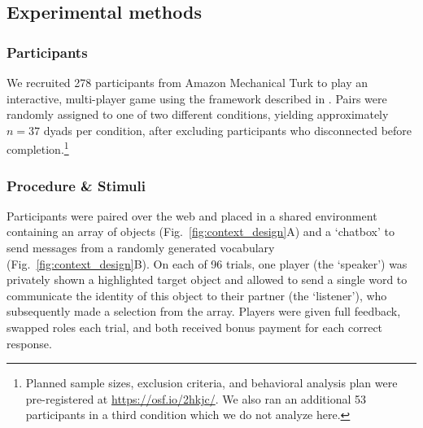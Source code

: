 			
\subsection{Experimental methods}

\subsubsection{Participants}

We recruited 278 participants from Amazon Mechanical Turk to play an interactive, multi-player game using the framework described in . Pairs were randomly assigned to one of two different conditions, yielding approximately $n=37$ dyads per condition, after excluding participants who disconnected before completion.\footnote{Planned sample sizes, exclusion criteria, and behavioral analysis plan were pre-registered at \url{https://osf.io/2hkjc/}. We also ran an additional 53 participants in a third condition which we do not analyze here.}

\subsubsection{Procedure \& Stimuli}
Participants were paired over the web and placed in a shared environment containing an array of objects (Fig.\ \ref{fig:context_design}A) and a `chatbox' to send messages from a randomly generated vocabulary (Fig.\ \ref{fig:context_design}B). On each of 96 trials, one player (the `speaker') was privately shown a highlighted target object and allowed to send a single word to communicate the identity of this object to their partner (the `listener'), who subsequently made a selection from the array. Players were given full feedback, swapped roles each trial, and both received bonus payment for each correct response.

